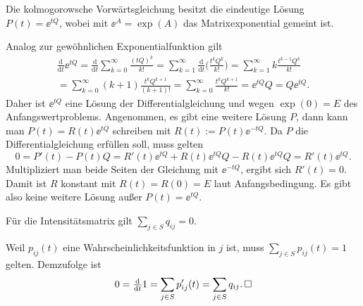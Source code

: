\begin{Satz}
Die kolmogorowsche Vorwärtsgleichung besitzt die eindeutige Lösung
$P(t)=\ee^{tQ}$, wobei mit $\ee^A=\exp(A)$ das Matrixexponential
gemeint ist. 
\end{Satz}
\begin{Beweis}
Analog zur gewöhnlichen Exponentialfunktion gilt
\begin{gather*}
\frac{\mathrm d}{\mathrm dt}\ee^{tQ}
= \frac{\mathrm d}{\mathrm dt}\sum_{k=0}^\infty \frac{(tQ)^k}{k!}
= \sum_{k=1}^\infty \frac{\mathrm d}{\mathrm dt}\bigg(\frac{t^k Q^k}{k!}\bigg)
= \sum_{k=1}^\infty k\frac{t^{k-1} Q^k}{k!}\\
= \sum_{k=0}^\infty (k+1)\frac{t^k Q^{k+1}}{(k+1)!}
= \sum_{k=0}^\infty \frac{t^k Q^{k+1}}{k!} = \ee^{tQ}Q = Q\ee^{tQ}.
\end{gather*}
Daher ist $\ee^{tQ}$ eine Lösung der Differentialgleichung und
wegen $\exp(0)=E$ des Anfangswertproblems. Angenommen, es gibt eine
weitere Lösung $P$, dann kann man $P(t) = R(t)\ee^{tQ}$
schreiben mit $R(t):=P(t)\ee^{-tQ}$. Da $P$ die
Differentialgleichung erfüllen soll, muss gelten
\[0 = P'(t) - P(t)Q = R'(t)\ee^{tQ} + R(t)\ee^{tQ}Q - R(t)\ee^{tQ}Q = R'(t)\ee^{tQ}.\]
Multipliziert man beide Seiten der Gleichung mit $\ee^{-tQ}$, ergibt sich
$R'(t)=0$. Damit ist $R$ konstant mit $R(t)=R(0)=E$ laut Anfangsbedingung.
Es gibt also keine weitere Lösung außer $P(t)=\ee^{tQ}$.\,\qedsymbol
\end{Beweis}

\begin{Korollar}\label{intensity-matrix-row-sum}
Für die Intensitätsmatrix gilt $\sum_{j\in S} q_{ij} = 0$.
\end{Korollar}
\begin{Beweis}
Weil $p_{ij}(t)$ eine Wahrscheinlichkeitsfunktion in $j$ ist, muss
$\sum_{j\in S}p_{ij}(t)=1$ gelten. Demzufolge ist
\[0  = \tfrac{\mathrm d}{\mathrm dt} 1 = \sum_{j\in S} p_{ij}'(t)
= \sum_{j\in S} q_{ij}.\,\square\]
\end{Beweis}

